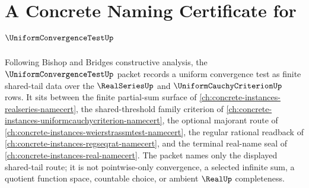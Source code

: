 \chapter{A Concrete Naming Certificate for $\UniformConvergenceTestUp$}
\label{ch:concrete-instances-uniform-convergence-test-namecert}

Following Bishop and Bridges constructive analysis, the $\UniformConvergenceTestUp$ packet records a uniform convergence test as finite shared-tail data over the $\RealSeriesUp$ and $\UniformCauchyCriterionUp$ rows. It sits between the finite partial-sum surface of \autoref{ch:concrete-instances-realseries-namecert}, the shared-threshold family criterion of \autoref{ch:concrete-instances-uniformcauchycriterion-namecert}, the optional majorant route of \autoref{ch:concrete-instances-weierstrassmtest-namecert}, the regular rational readback of \autoref{ch:concrete-instances-regseqrat-namecert}, and the terminal real-name seal of \autoref{ch:concrete-instances-real-namecert}. The packet names only the displayed shared-tail route; it is not pointwise-only convergence, a selected infinite sum, a quotient function space, countable choice, or ambient $\RealUp$ completeness.

